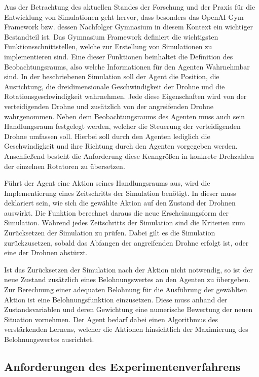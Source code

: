 Aus der Betrachtung des aktuellen Standes der Forschung und der Praxis für die Entwicklung von Simulationen geht hervor, dass besonders das OpenAI Gym Framework bzw. dessen Nachfolger Gymnasium in diesem Kontext ein wichtiger Bestandteil ist.
Das Gymnasium Framework definiert die wichtigsten Funktionsschnittstellen, welche zur Erstellung von Simulationen zu implementieren sind.
Eine dieser Funktionen beinhaltet die Definition des Beobachtungsraums, also welche Informationen für den Agenten Wahrnehmbar sind. 
In der beschriebenen Simulation soll der Agent die Position, die Ausrichtung, die dreidimensionale Geschwindigkeit der Drohne und die Rotationsgeschwindigkeit wahrnehmen.
Jede diese Eigenschaften wird von der verteidigenden Drohne und zusätzlich von der angreifenden Drohne wahrgenommen. 
Neben dem Beobachtungsraums des Agenten muss auch sein Handlungsraum festgelegt werden, welcher die Steuerung der verteidigenden Drohne umfassen soll.
Hierbei soll durch den Agenten lediglich die Geschwindigkeit und ihre Richtung durch den Agenten vorgegeben werden.
Anschließend besteht die Anforderung diese Kenngrößen in konkrete Drehzahlen der einzelnen Rotatoren zu übersetzen.

Führt der Agent eine Aktion seines Handlungsraums aus, wird die Implementierung eines Zeitschritts der Simulation benötigt.
In dieser muss deklariert sein, wie sich die gewählte Aktion auf den Zustand der Drohnen auswirkt.
Die Funktion berechnet daraus die neue Erscheinungsform der Simulation.
Während jedes Zeitschritts der Simulation sind die Kriterien zum Zurücksetzen der Simulation zu prüfen.
Dabei gilt es die Simulation zurückzusetzen, sobald das Abfangen der angreifenden Drohne erfolgt ist, oder eine der Drohnen abstürzt.

Ist das Zurücksetzen der Simulation nach der Aktion nicht notwendig, so ist der neue Zustand zusätzlich eines Belohnungswertes an den Agenten zu übergeben.
Zur Berechnung einer adequaten Belohnung für die Ausführung der gewählten Aktion ist eine Belohnungsfunktion einzusetzen.
Diese muss anhand der Zustandsvariablen und deren Gewichtung eine numerische Bewertung der neuen Situation vornehmen.
Der Agent bedarf dabei einen Algorithmus des verstärkenden Lernens, welcher die Aktionen hinsichtlich der Maximierung des Belohnungswertes ausrichtet. 

\subsection{Anforderungen des Experimentenverfahrens}


